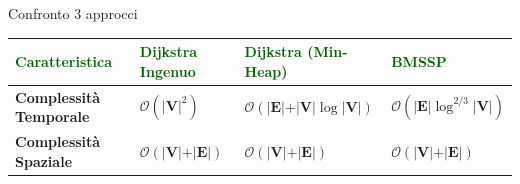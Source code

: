 \documentclass[aspectratio=169]{beamer}
\begin{document}
\begin{frame}{Confronto 3 approcci}
    \begin{table}
        \centering
        \renewcommand{\arraystretch}{1.8}
        \begin{tabular}{|p{2.6cm}|p{3.2cm}|p{3.6cm}|p{3.2cm}|} 
        \hline
        \textbf{\textcolor{darkgreen}{Caratteristica}} & \textbf{\textcolor{darkgreen}{Dijkstra Ingenuo}} & \textbf{\textcolor{darkgreen}{Dijkstra (Min-Heap)}} & \textbf{\textcolor{darkgreen}{BMSSP}} \\ \hline
        \textbf{Complessità Temporale} & $\mathcal{O}(\vert \mathbf{V}\vert^2)$ & $\mathcal{O}(\vert \mathbf{E}\vert + \vert \mathbf{V}\vert \log \vert \mathbf{V}\vert)$ & $\mathcal{O}(\vert \mathbf{E}\vert \log^{2/3} \vert \mathbf{V}\vert)$ \\ \hline
        \textbf{Complessità Spaziale} & $\mathcal{O}(\vert \mathbf{V}\vert + \vert \mathbf{E}\vert)$ & $\mathcal{O}(\vert \mathbf{V}\vert + \vert \mathbf{E}\vert)$ & $\mathcal{O}(\vert \mathbf{V}\vert + \vert \mathbf{E}\vert)$ \\ \hline
        \end{tabular}
    \end{table}  
\end{frame}
\end{document}

